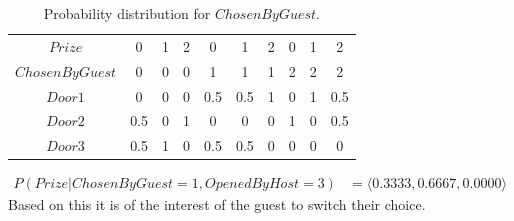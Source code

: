 \documentclass[10pt, a4paper, english]{../Template/NTNUoving}
\begin{document}
\begin{oppgave}
\begin{punkt}
        \begin{table}[H]
            \centering
            \begin{tabular}{|c|c|c|c|c|c|c|c|c|c|}
                \hline
                $Prize$ & 0 & 1 & 2 & 0 & 1 & 2 & 0 & 1 & 2 \\ [1.0ex]
                $ChosenByGuest$ & 0 & 0 & 0 & 1 & 1 & 1 & 2& 2 & 2 \\ [1.0ex]
                \hline
                $Door1$ & 0 & 0 & 0 & 0.5 & 0.5 & 1 & 0 & 1  & 0.5 \\ [1.0ex]
                $Door2$ & 0.5 & 0 & 1 & 0 & 0 & 0 & 1 & 0 & 0.5 \\ [1.0ex]
                $Door3$ & 0.5 & 1 & 0 & 0.5 & 0.5 & 0 & 0 & 0 & 0 \\ [1.0ex]
                \hline
            \end{tabular}
            \caption{Probability distribution for $ChosenByGuest$.}
        \end{table}

        \begin{align*}
            P(Prize | ChosenByGuest = 1, OpenedByHost = 3) &= \langle 0.3333, 0.6667, 0.0000 \rangle
        \end{align*}
        Based on this it is of the interest of the guest to switch their choice.
    \end{punkt}
\end{oppgave}
\end{document}
